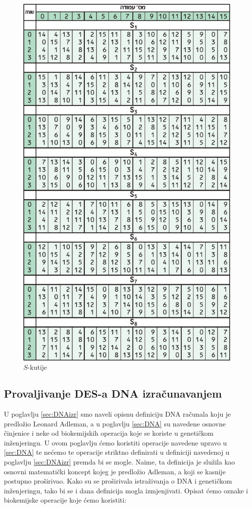 \documentclass[a4paper,oneside,12pt]{memoir} %
\begin{document}
\begin{spacing}{1.5}
\begin{figure}[h]
\centering \includegraphics[scale=0.52]{S-box.jpg}
\caption{$S$-kutije}
\label{fig:sbox}
\end{figure}
 \newpage
\subsection{Provaljivanje DES-a DNA izračunavanjem}
U poglavlju \ref{sec:DNAizr} smo naveli opisnu definiciju DNA računala koju je predložio Leonard Adleman, a u poglavlju \ref{sec:DNA} su navedene osnovne činjenice i neke od biokemijskih operacija koje se koriste u genetičkom inženjeringu. U ovom poglavlju ćemo koristiti operacije navedene upravo u \ref{sec:DNA} te nećemo te operacije striktno definirati u definiciji navedenoj u poglavlju \ref{sec:DNAizr} premda bi se mogle. Naime, ta definicija je služila kao osnovni matematički koncept kojeg je predložio Adleman, a koji se kasnije postupno proširivao. Kako su se proširivala istraživanja o DNA i genetičkom inženjeringu, tako bi se i dana definicija mogla izmjenjivati. Opisat ćemo oznake i biokemijske operacije koje ćemo koristiti:
 

\end{spacing}
\end{document}
